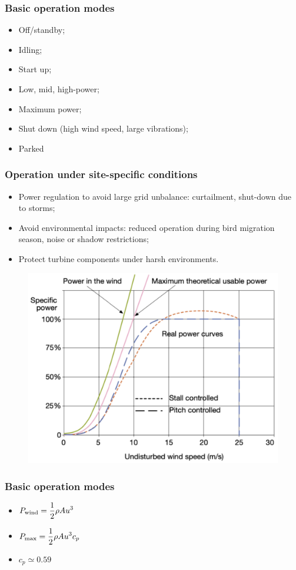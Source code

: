 \documentclass{article}
\begin{document}
\phantom{}
\vspace*{-.8cm}
\subsubsection{Basic operation modes}
\begin{itemize}
    \item Off/standby;
    \item Idling;
    \item Start up;
    \item Low, mid, high-power;
    \item Maximum power;
    \item Shut down (high wind speed, large vibrations);
    \item Parked
\end{itemize}
\wrapfill

\subsubsection{Operation under site-specific conditions}
\begin{itemize}
    \item Power regulation to avoid large grid unbalance: curtailment, shut-down due to storms;
    \item Avoid environmental impacts: reduced operation during bird migration season, noise or shadow restrictions;
    \item Protect turbine components under harsh environments.
\end{itemize}

\setlength{\intextsep}{0pt}%
\begin{figure}
    \includegraphics[width=.5\textwidth]{media/turbine_output.png}
    \vspace{-5cm}
\end{figure}

\phantom{}
\vspace*{-.8cm}
\subsubsection{Basic operation modes}
\begin{itemize}
    \item $P_{\text{wind}} = \displaystyle \frac{1}{2}\rho Au^3$
    \item $P_{\text{max}} = \displaystyle \frac{1}{2}\rho Au^3c_p$
    \item $c_p \simeq 0.59$
\end{itemize}
\wrapfill
\end{document}
